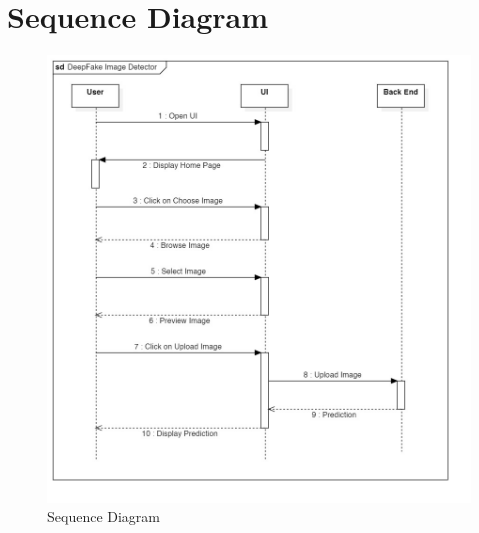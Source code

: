 \section{Sequence Diagram}
\begin{figure}[ht]
  \includegraphics[width=1\textwidth]{./img/sequence diagram.jpg}
  \caption{Sequence Diagram}
\end{figure}

\pagebreak
